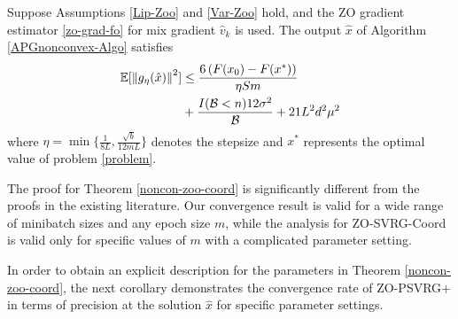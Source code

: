 \begin{theorem}\label{noncon-zoo-coord}
Suppose Assumptions \ref{Lip-Zoo} and \ref{Var-Zoo} hold, and the ZO gradient estimator \eqref{zo-grad-fo} for mix gradient $\hat{v}_k$ is used. The output $\hat{x}$ of Algorithm \ref{APGnonconvex-Algo} satisfies
\begin{align}
\mathbb{E}[\left\lVert g_{\eta}(\hat{x})\right\rVert^2] & \leq \frac{6\left(F(x_0) - F({x}^*)\right)}{\eta Sm}\notag\\
& + \frac{I(\mathcal{B} < n)12\sigma ^2}{\mathcal{B}}+21{L^2 d^2 \mu^2}\notag
\end{align}
where $\eta = \min\{\frac{1}{8L}, \frac{\sqrt{b}}{12mL}\}$ denotes the stepsize and $x^*$ represents the optimal value of problem \ref{problem}.
\end{theorem}
\iffalse
ZO-SVRG-Coord and ZO-ProxSVRG/SAGA used a Lyapunov function to show that the accumulated gradient mapping decreases with epoch $s$. In our analysis, we explicitly prove that $F(x^s)$ decreases and therefore, the proof for Theorem \ref{noncon-zoo-coord} is significantly different from proofs in the existing literature. This  decent in function values is achieved through employing the inequalities using Lemma \ref{var-estimate-lem} which provides a more straightforward exploration for our ZO-PSVRG+ versus ZO-SVRG-Coord, ZO-ProxSVRG and ZO-ProxSAGA. 
\fi
The proof for Theorem \ref{noncon-zoo-coord} is
significantly different from the proofs in the existing literature. Our convergence result is valid for a wide range of minibatch sizes and any epoch size $m$, while the analysis for ZO-SVRG-Coord is valid only for specific values of $m$ with a complicated parameter setting.
\iffalse
In contrast to the convergence rate of SVRG in \cite{reddi2016proximal}, Theorem \ref{noncon-zoo-coord} presents two
extra error terms $\frac{I(\mathcal{B} < n)\sigma ^2}{\mathcal{B}}$ and $O(L^2d^2\mu^2)$, attributed to batch gradient estimation $\mathcal{B} < n$ and the use of SZO gradient approximations, respectively. The error related to $\mathcal{B} < n$ is removed only when $\mathcal{B} = n$. 
Note that the stepsize  $\eta$ depends on the epoch length $m$, and the minibatch size $b$. 
\fi
In order to obtain an explicit description for the  parameters in Theorem \ref{noncon-zoo-coord}, the next corollary demonstrates the convergence rate of ZO-PSVRG+ in terms of precision at the solution $\hat{x}$ for specific parameter settings.
